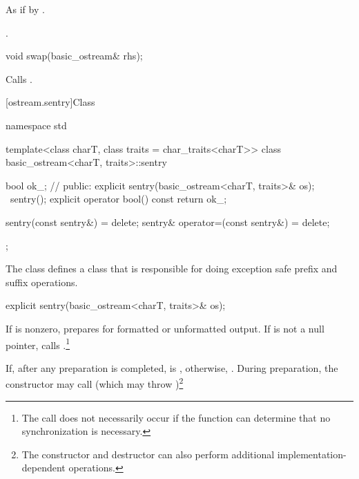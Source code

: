 \begin{itemdescr}
\pnum
\effects As if by .

\pnum
\returns {}.
\end{itemdescr}

%
\begin{itemdecl}
void swap(basic_ostream& rhs);
\end{itemdecl}

\begin{itemdescr}
\pnum
\effects Calls .
\end{itemdescr}

[ostream.sentry]{Class }

%
%
\begin{codeblock}
namespace std {
  template<class charT, class traits = char_traits<charT>>
  class basic_ostream<charT, traits>::sentry {
    bool ok_; // \expos
  public:
    explicit sentry(basic_ostream<charT, traits>& os);
    ~sentry();
    explicit operator bool() const { return ok_; }

    sentry(const sentry&) = delete;
    sentry& operator=(const sentry&) = delete;
  };
}
\end{codeblock}

\pnum
The class
defines a class that is responsible for doing exception safe prefix and suffix
operations.

%
\begin{itemdecl}
explicit sentry(basic_ostream<charT, traits>& os);
\end{itemdecl}

\begin{itemdescr}
\pnum
If
is nonzero, prepares for formatted or unformatted output.
If
is not a null pointer, calls
%
.\footnote{The call
does not necessarily occur if the function can determine that no
synchronization is necessary.}

\pnum
If, after any preparation is completed,
is
,
otherwise,
.
During preparation, the constructor may call
(which may throw
)\footnote{The
constructor and destructor
can also perform additional
%
implementation-dependent operations.}
\end{itemdescr}


